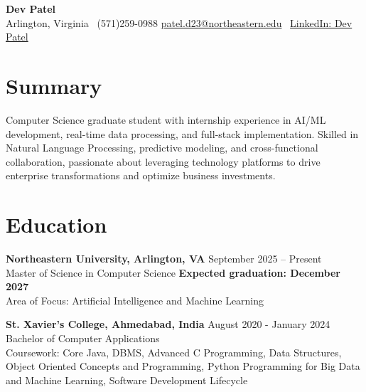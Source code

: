\documentclass[a4paper,10pt]{article}
\begin{document}
\begin{center}
\vspace{-3mm}
    \fontsize{16}{18}\selectfont \textbf{Dev Patel} \\
    \vspace{0mm}
    \normalsize Arlington, Virginia \textbar\ (571)259-0988  \textbar       \href{mailto:patel.d23@northeastern.edu}{patel.d23@northeastern.edu} \textbar\ \href{https://www.linkedin.com/in/devxpatel//}{LinkedIn: Dev Patel} \\
\end{center}



\section*{Summary}
Computer Science graduate student with internship experience in AI/ML development, real-time data processing, and full-stack implementation. Skilled in Natural Language Processing, predictive modeling, and cross-functional collaboration, passionate about leveraging technology platforms to drive enterprise transformations and optimize business investments.
 
\vspace{ 0 mm}
\section*{Education}
\textbf{Northeastern University, Arlington, VA} \hfill September 2025 -- Present\\
Master of Science in Computer Science \hfill \textbf{Expected graduation: December 2027} \\
Area of Focus: Artificial Intelligence and Machine Learning

\vspace{1 mm} %
\textbf{St. Xavier's College, Ahmedabad, India} \hfill August 2020 - January 2024 \\
Bachelor of Computer Applications\\
Coursework: Core Java, DBMS, Advanced C Programming, Data Structures, Object Oriented Concepts and Programming, Python Programming for Big Data and Machine Learning, Software Development Lifecycle
\end{document}
